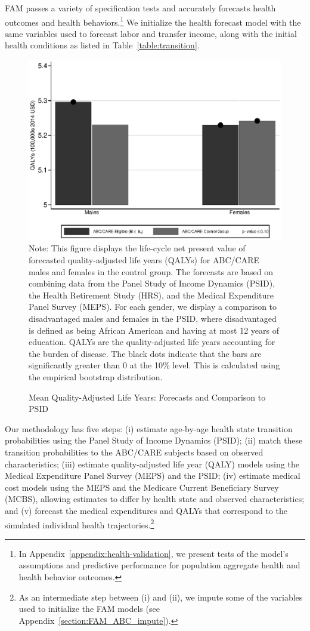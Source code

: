 FAM passes a variety of specification tests and accurately forecasts health outcomes and health behaviors.\footnote{In Appendix~\ref{appendix:health-validation}, we present tests of the model's assumptions and predictive performance for population aggregate health and health behavior outcomes.} We initialize the health forecast model with the same variables used to forecast labor and transfer income, along with the initial health conditions as listed in Table~\ref{table:transition}.

\begin{figure}[!htbp]
\caption{Mean Quality-Adjusted Life Years: Forecasts and Comparison to PSID}\label{fig:qalys}
\centering
\includegraphics[width=.7\columnwidth]{output/qalyexppsid.eps}
\footnotesize \justify
Note:  This figure displays the life-cycle net present value of forecasted quality-adjusted life years (QALYs) for ABC/CARE males and females in the control group. The forecasts are based on combining data from the Panel Study of Income Dynamics (PSID), the Health Retirement Study (HRS), and the Medical Expenditure Panel Survey (MEPS). For each gender, we display a comparison to disadvantaged males and females in the PSID, where disadvantaged is defined as being African American and having at most 12 years of education. QALYs are the quality-adjusted life years accounting for the burden of disease. The black dots indicate that the bars are significantly greater than 0 at the 10\% level. This is calculated using the empirical bootstrap distribution.
\end{figure}

Our methodology has five steps: (i) estimate age-by-age health state transition probabilities using the Panel Study of Income Dynamics (PSID); (ii) match these transition probabilities to the ABC/CARE subjects based on observed characteristics; (iii) estimate quality-adjusted life year (QALY) models using the Medical Expenditure Panel Survey (MEPS) and the PSID; (iv) estimate medical cost models using the MEPS and the Medicare Current Beneficiary Survey (MCBS), allowing estimates to differ by health state and observed characteristics; and (v) forecast the medical expenditures and QALYs that correspond to the simulated individual health trajectories.\footnote{As an intermediate step between (i) and (ii), we impute some of the variables used to initialize the FAM models (see  Appendix~\ref{section:FAM_ABC_impute}).}


